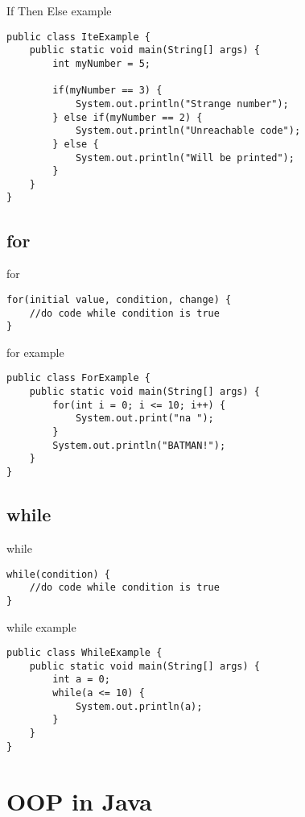 \begin{frame}[fragile]{{\huge I}f {\huge T}hen {\huge E}lse example}
\begin{lstlisting}
public class IteExample {
	public static void main(String[] args) {
		int myNumber = 5;
		
		if(myNumber == 3) {
			System.out.println("Strange number");
		} else if(myNumber == 2) {
			System.out.println("Unreachable code");
		} else {
			System.out.println("Will be printed");
		}
	}
}
\end{lstlisting}
\end{frame}

\subsection{for}
\begin{frame}[fragile]{for}
\begin{lstlisting}
for(initial value, condition, change) {
	//do code while condition is true
}
\end{lstlisting}
\end{frame}

\begin{frame}[fragile]{for example}
\begin{lstlisting}
public class ForExample {
	public static void main(String[] args) {
		for(int i = 0; i <= 10; i++) {
			System.out.print("na ");
		}
		System.out.println("BATMAN!");
	}
}
\end{lstlisting}
\end{frame}

\subsection{while}
\begin{frame}[fragile]{while}
\begin{lstlisting}
while(condition) {
	//do code while condition is true
}
\end{lstlisting}
\end{frame}

\begin{frame}[fragile]{while example}
\begin{lstlisting}
public class WhileExample {
	public static void main(String[] args) {
		int a = 0;
		while(a <= 10) {
			System.out.println(a);
		}
	}
}
\end{lstlisting}
\end{frame}


\section{OOP in Java}

